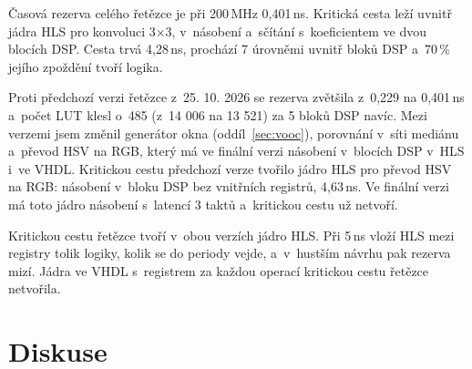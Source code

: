 
Časová rezerva celého řetězce je při 200\,MHz 0,401\,ns. Kritická cesta leží uvnitř jádra HLS pro konvoluci 3×3, v~násobení a~sčítání s~koeficientem ve dvou blocích DSP. Cesta trvá 4,28\,ns, prochází 7 úrovněmi uvnitř bloků DSP a~70\,\% jejího zpoždění tvoří logika.

Proti předchozí verzi řetězce z~25. 10. 2026 se rezerva zvětšila z~0,229 na 0,401\,ns a~počet LUT klesl o~485 (z~14 006 na 13 521) za 5 bloků DSP navíc. Mezi verzemi jsem změnil generátor okna (oddíl~\ref{sec:vooc}), porovnání v~síti mediánu a~převod HSV na RGB, který má ve finální verzi násobení v~blocích DSP v~HLS i~ve VHDL. Kritickou cestu předchozí verze tvořilo jádro HLS pro převod HSV na RGB: násobení v~bloku DSP bez vnitřních registrů, 4,63\,ns. Ve finální verzi má toto jádro násobení s~latencí 3 taktů a~kritickou cestu už netvoří.

Kritickou cestu řetězce tvoří v~obou verzích jádro HLS. Při 5\,ns vloží HLS mezi registry tolik logiky, kolik se do periody vejde, a~v~hustším návrhu pak rezerva mizí. Jádra ve VHDL s~registrem za každou operací kritickou cestu řetězce netvořila.


\section{Diskuse}
\label{sec:diskuse}








